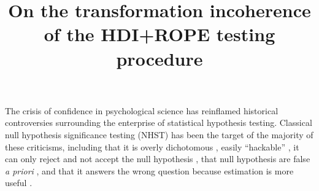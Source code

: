 \documentclass[man]{apa}
\title{On the transformation incoherence of the HDI+ROPE testing procedure}
\newcommand{\hdr}{HDRP}
\begin{document}

\maketitle




\noindent The crisis of confidence in psychological science has reinflamed historical controversies surrounding the enterprise of statistical hypothesis testing.  Classical null hypothesis significance testing (NHST) has been the target of the majority of these criticisms, including that it is overly dichotomous \cite{gibson2021}, easily ``hackable'' \cite{SimmonsEtAl2011}, it can only reject and not accept the null hypothesis \cite{Rouder2009ttest}, that null hypothesis are false \textit{a priori} \cite{Cohen1994,mcshane2019}, and that it answers the wrong question because estimation is more useful \cite{Cumming2014}. %

\end{document}
